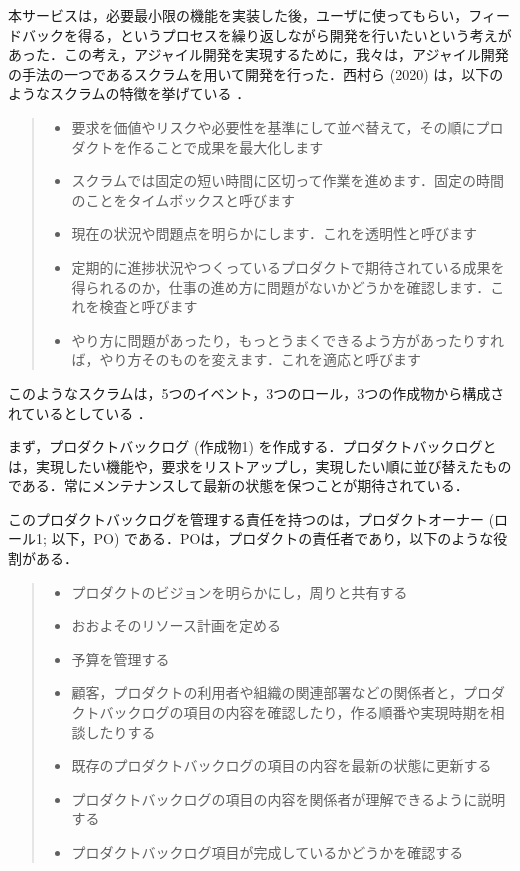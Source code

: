 本サービスは，必要最小限の機能を実装した後，ユーザに使ってもらい，フィードバックを得る，というプロセスを繰り返しながら開発を行いたいという考えがあった．この考え，アジャイル開発を実現するために，我々は，アジャイル開発の手法の一つであるスクラムを用いて開発を行った．西村ら (2020) は，以下のようなスクラムの特徴を挙げている \cite{scrum}．

\begin{quote}
    \begin{itemize}
        \item 要求を価値やリスクや必要性を基準にして並べ替えて，その順にプロダクトを作ることで成果を最大化します
        \item スクラムでは固定の短い時間に区切って作業を進めます．固定の時間のことをタイムボックスと呼びます
        \item 現在の状況や問題点を明らかにします．これを透明性と呼びます
        \item 定期的に進捗状況やつくっているプロダクトで期待されている成果を得られるのか，仕事の進め方に問題がないかどうかを確認します．これを検査と呼びます
        \item やり方に問題があったり，もっとうまくできるよう方があったりすれば，やり方そのものを変えます．これを適応と呼びます
    \end{itemize}
\end{quote}

このようなスクラムは，5つのイベント，3つのロール，3つの作成物から構成されているとしている \cite{scrum}．

まず，プロダクトバックログ (作成物1) を作成する．プロダクトバックログとは，実現したい機能や，要求をリストアップし，実現したい順に並び替えたものである．常にメンテナンスして最新の状態を保つことが期待されている．

このプロダクトバックログを管理する責任を持つのは，プロダクトオーナー (ロール1; 以下，PO) である．POは，プロダクトの責任者であり，以下のような役割がある．
\begin{quote}
    \begin{itemize}
        \item プロダクトのビジョンを明らかにし，周りと共有する
        \item おおよそのリソース計画を定める
        \item 予算を管理する
        \item 顧客，プロダクトの利用者や組織の関連部署などの関係者と，プロダクトバックログの項目の内容を確認したり，作る順番や実現時期を相談したりする
        \item 既存のプロダクトバックログの項目の内容を最新の状態に更新する
        \item プロダクトバックログの項目の内容を関係者が理解できるように説明する
        \item プロダクトバックログ項目が完成しているかどうかを確認する
    \end{itemize}
\end{quote}

